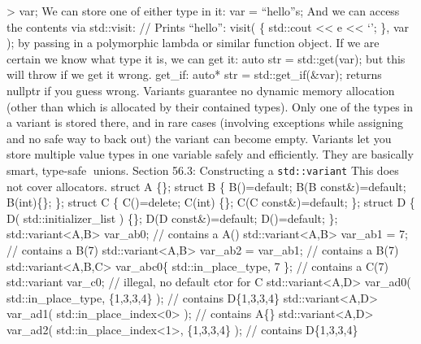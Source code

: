 \textgreater{} var; We can store one of either type in it: var =
``hello''s; And we can access the contents via std::visit: // Prints
``hello\n'': visit( \href{auto\&\&\%20e}{} \{ std::cout
\textless\textless{} e \textless\textless{} `\n'; \}, var ); by passing
in a polymorphic lambda or similar function object. If we are certain we
know what type it is, we can get it: auto str = std::get(var); but this
will throw if we get it wrong. get\_if: auto* str = std::get\_if(\&var);
returns nullptr if you guess wrong. Variants guarantee no dynamic memory
allocation (other than which is allocated by their contained types).
Only one of the types in a variant is stored there, and in rare cases
(involving exceptions while assigning and no safe way to back out) the
variant can become empty. Variants let you store multiple value types in
one variable safely and eﬃciently. They are basically smart, type-safe
unions. Section 56.3: Constructing a
\passthrough{\lstinline!std::variant!} This does not cover allocators.
struct A \{\}; struct B \{ B()=default; B(B const\&)=default;
B(int)\{\}; \}; struct C \{ C()=delete; C(int) \{\}; C(C
const\&)=default; \}; struct D \{ D( std::initializer\_list ) \{\}; D(D
const\&)=default; D()=default; \};
std::variant\textless A,B\textgreater{} var\_ab0; // contains a A()
std::variant\textless A,B\textgreater{} var\_ab1 = 7; // contains a B(7)
std::variant\textless A,B\textgreater{} var\_ab2 = var\_ab1; // contains
a B(7) std::variant\textless A,B,C\textgreater{} var\_abc0\{
std::in\_place\_type, 7 \}; // contains a C(7) std::variant var\_c0; //
illegal, no default ctor for C std::variant\textless A,D\textgreater{}
var\_ad0( std::in\_place\_type, \{1,3,3,4\} ); // contains D\{1,3,3,4\}
std::variant\textless A,D\textgreater{} var\_ad1(
std::in\_place\_index\textless0\textgreater{} ); // contains A\{\}
std::variant\textless A,D\textgreater{} var\_ad2(
std::in\_place\_index\textless1\textgreater, \{1,3,3,4\} ); // contains
D\{1,3,3,4\}
